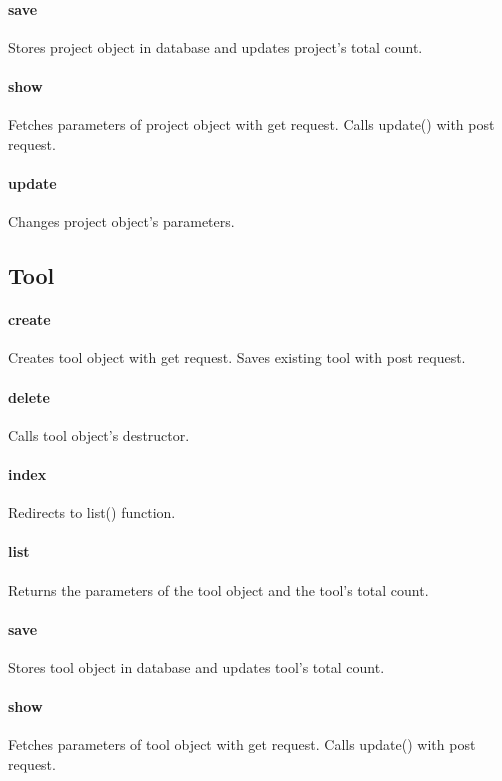 \documentclass[12pt]{article}
\begin{document}
\paragraph{save} Stores project object in database and updates project's total count.
\paragraph{show} Fetches parameters of project object with get request. Calls update() with post request.
\paragraph{update} Changes project object's parameters.

\subsection{Tool}\label{sec:CTool}
\paragraph{create} Creates tool object with get request. Saves existing tool with post request.
\paragraph{delete} Calls tool object's destructor.
\paragraph{index} Redirects to list() function.
\paragraph{list} Returns the parameters of the tool object and the tool's total count.
\paragraph{save} Stores tool object in database and updates tool's total count.
\paragraph{show} Fetches parameters of tool object with get request. Calls update() with post request.
\end{document}
